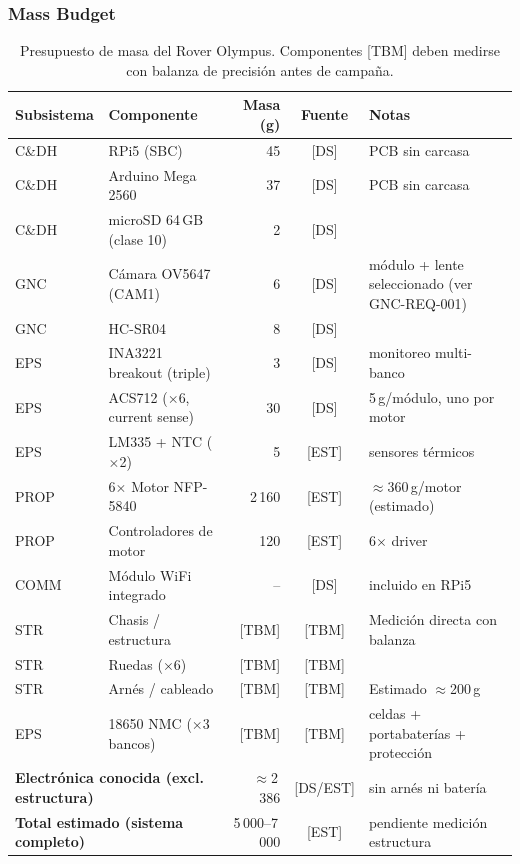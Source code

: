 \subsubsection{Mass Budget}

\begin{table}[H]
\centering
\scriptsize
\renewcommand{\arraystretch}{1.3}
\begin{tabularx}{\textwidth}{| l | l | r | c | X |}
\hline
\textbf{Subsistema} & \textbf{Componente} & \textbf{Masa (g)} & \textbf{Fuente} & \textbf{Notas} \\ \hline

C\&DH  & RPi5 (SBC)                & 45    & [DS]  & PCB sin carcasa \\ \hline
C\&DH  & Arduino Mega 2560         & 37    & [DS]  & PCB sin carcasa \\ \hline
C\&DH  & microSD 64\,GB (clase 10) & 2     & [DS]  & \\ \hline
GNC    & Cámara OV5647 (CAM1)      & 6     & [DS]  & módulo + lente seleccionado (ver GNC-REQ-001) \\ \hline
GNC    & HC-SR04                   & 8     & [DS]  & \\ \hline
EPS    & INA3221 breakout (triple) & 3     & [DS]  & monitoreo multi-banco \\ \hline
EPS    & ACS712 ($\times$6, current sense) & 30 & [DS] & 5\,g/módulo, uno por motor \\ \hline
EPS    & LM335 + NTC ($\times$2)   & 5     & [EST] & sensores térmicos \\ \hline
PROP   & 6$\times$ Motor NFP-5840  & 2\,160 & [EST] & $\approx$360\,g/motor (estimado) \\ \hline
PROP   & Controladores de motor    & 120   & [EST] & 6$\times$ driver \\ \hline
COMM   & Módulo WiFi integrado     & --    & [DS]  & incluido en RPi5 \\ \hline
STR    & Chasis / estructura       & {[TBM]} & [TBM] & Medición directa con balanza \\ \hline
STR    & Ruedas ($\times$6)        & {[TBM]} & [TBM] & \\ \hline
STR    & Arnés / cableado          & {[TBM]} & [TBM] & Estimado $\approx$200\,g \\ \hline
EPS    & 18650 NMC ($\times$3 bancos) & {[TBM]} & [TBM] & celdas + portabaterías + protección \\ \hline
\hline
\multicolumn{2}{|l|}{\textbf{Electrónica conocida (excl. estructura)}} & $\approx$2\,386 & [DS/EST] & sin arnés ni batería \\ \hline
\multicolumn{2}{|l|}{\textbf{Total estimado (sistema completo)}}       & 5\,000--7\,000 & [EST] & pendiente medición estructura \\ \hline
\end{tabularx}
\caption{Presupuesto de masa del Rover Olympus. Componentes [TBM] deben medirse con balanza de precisión antes de campaña.}
\label{tab:mass_budget}
\end{table}


